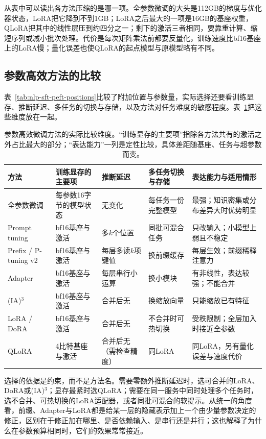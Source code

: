 从表中可以读出各方法压缩的是哪一项。全参数微调的大头是112GB的梯度与优化器状态，LoRA把它降到不到1GB；LoRA之后最大的一项是16GB的基座权重，QLoRA把其中的线性层压到约四分之一；剩下的激活三者相同，要靠重计算、缩短序列或减小批次处理。代价是每次矩阵乘法前都要反量化，训练速度比bf16基座上的LoRA慢；量化误差也使QLoRA的起点模型与原模型略有不同。

\subsection{参数高效方法的比较}
\label{sec:nlp-sft-peft-comparison}

表~\ref{tab:nlp-sft-peft-positions}比较了附加位置与参数量，实际选择还要看训练显存、推断延迟、多任务的切换与存储，以及方法对任务难度的敏感程度。表~\ref{tab:nlp-sft-peft-comparison}把这些维度放在一起。

\begin{table}[htbp]
  \small
  \begin{tabularx}{\linewidth}{@{}p{22mm}p{26mm}p{30mm}p{30mm}X@{}}
    \toprule
    方法 & 训练显存的主要项 & 推断延迟 & 多任务切换与存储 & 表达能力与适用情形\\
    \midrule
    全参数微调 & 每参数16字节的模型状态 & 无变化 & 每任务一份完整模型 & 最强；知识密集或分布差异大时优势明显\\
    Prompt tuning & bf16基座与激活 & 多$k$个位置 & 同批可混合任务 & 只改输入；小模型上弱且不稳定\\
    Prefix / P-tuning v2 & bf16基座与激活 & 每层多读$k$项键值 & 换前缀缓存 & 每层生效；前缀稀释注意力\\
    Adapter & bf16基座与激活 & 每层串行小运算 & 换小模块 & 有非线性，表达较强；不能合并\\
    (IA)$^3$ & bf16基座与激活 & 合并后无 & 换缩放向量 & 只能缩放已有特征\\
    LoRA / DoRA & bf16基座与激活 & 合并后无 & 不合并时可热切换 & 受秩限制；全层加入时接近全参数\\
    QLoRA & 4比特基座与激活 & 合并后无（需检查精度） & 同LoRA & 同LoRA，另有量化误差与速度代价\\
    \bottomrule
  \end{tabularx}
  \caption{参数高效微调方法的实际比较维度。“训练显存的主要项”指除各方法共有的激活之外占比最大的部分；“表达能力”一列是定性比较，具体差距随基座、任务与超参数而变。}
  \label{tab:nlp-sft-peft-comparison}
\end{table}

选择的依据是约束，而不是方法名。需要零额外推断延迟时，选可合并的LoRA、DoRA或(IA)$^3$；显存最紧时选QLoRA；需要在同一服务中同时处理多个任务时，选不合并、可热切换的LoRA适配器，或者同批可混合的软提示。从统一的角度看，前缀、Adapter与LoRA都是给某一层的隐藏表示加上一个由少量参数决定的修正，区别在于修正加在哪里、是否依赖输入、是串行还是并行\cite{nlp-sft-he2022unified}；这也解释了为什么在参数预算相同时，它们的效果常常接近。

